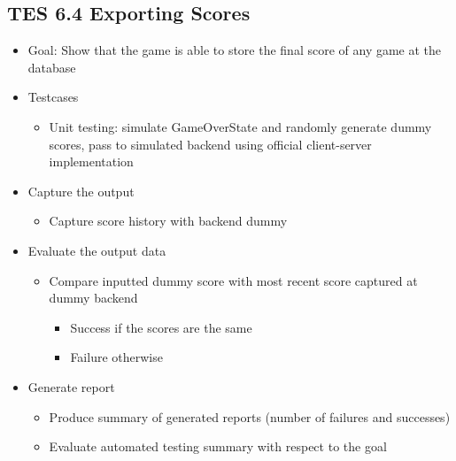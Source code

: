\subsection{TES 6.4 Exporting Scores}
\begin{itemize}
\item Goal: Show that the game is able to store the final score of any game at the database 

\item Testcases
\begin{itemize}
\item Unit testing: simulate GameOverState and randomly generate dummy scores, pass to simulated backend using official client-server implementation
\end{itemize}

\item Capture the output
\begin{itemize}
\item Capture score history with backend dummy
\end{itemize}

\item Evaluate the output data
\begin{itemize}
\item Compare inputted dummy score with most recent score captured at dummy backend
\begin{itemize}
\item Success if the scores are the same
\item Failure otherwise
\end{itemize}
\end{itemize}

\item Generate report
\begin{itemize}
\item Produce summary of generated reports (number of failures and successes)
\item Evaluate automated testing summary with respect to the goal
\end{itemize}
\end{itemize}

